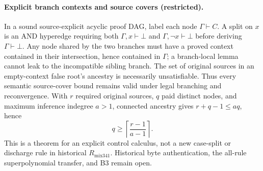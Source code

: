 \paragraph{Explicit branch contexts and source covers (restricted).}
In a sound source-explicit acyclic proof DAG, label each node $\Gamma\vdash C$.
A split on $x$ is an AND hyperedge requiring both
$\Gamma,x\vdash\bot$ and $\Gamma,\neg x\vdash\bot$ before deriving
$\Gamma\vdash\bot$.  Any node shared by the two branches must have a proved
context contained in their intersection, hence contained in $\Gamma$; a
branch-local lemma cannot leak to the incompatible sibling branch.  The set
of original sources in an empty-context false root's ancestry is necessarily
unsatisfiable.  Thus every semantic source-cover bound remains valid under
legal branching and reconvergence.  With $r$ required original sources, $q$
paid distinct nodes, and maximum inference indegree $a>1$, connected ancestry
gives $r+q-1\le aq$, hence
\[
q\ge\left\lceil\frac{r-1}{a-1}\right\rceil.
\]
This is a theorem for an explicit control calculus, not a new case-split or
discharge rule in historical $R_{\mathrm{mix341}}$.  Historical byte
authentication, the all-rule superpolynomial transfer, and B3 remain open.
